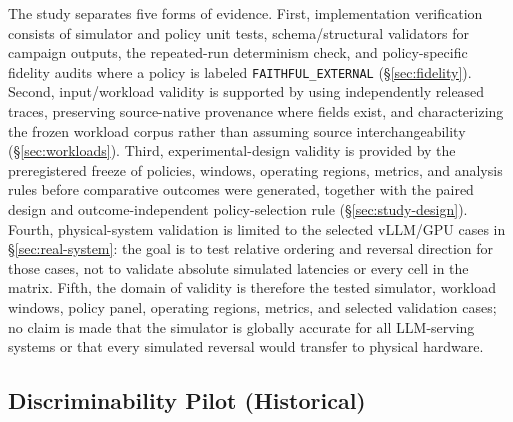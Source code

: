 The study separates five forms of evidence. First, implementation
verification consists of simulator and policy unit tests, schema/structural
validators for campaign outputs, the repeated-run determinism check, and
policy-specific fidelity audits where a policy is labeled
\texttt{FAITHFUL\_EXTERNAL} (\S\ref{sec:fidelity}). Second, input/workload
validity is supported by using independently released traces, preserving
source-native provenance where fields exist, and characterizing the frozen
workload corpus rather than assuming source interchangeability
(\S\ref{sec:workloads}). Third, experimental-design validity is provided by
the preregistered freeze of policies, windows, operating regions, metrics,
and analysis rules before comparative outcomes were generated, together
with the paired design and outcome-independent policy-selection rule
(\S\ref{sec:study-design}). Fourth, physical-system validation is limited
to the selected vLLM/GPU cases in \S\ref{sec:real-system}: the goal is to
test relative ordering and reversal direction for those cases, not to
validate absolute simulated latencies or every cell in the matrix. Fifth,
the domain of validity is therefore the tested simulator, workload windows,
policy panel, operating regions, metrics, and selected validation cases; no
claim is made that the simulator is globally accurate for all LLM-serving
systems or that every simulated reversal would transfer to physical
hardware.

\subsection{Discriminability Pilot (Historical)}
\label{sec:stage0}

